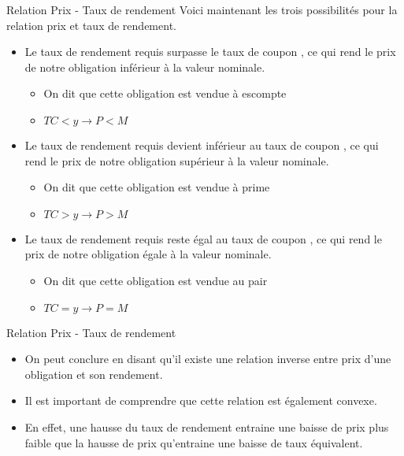\documentclass{beamer}
\begin{document}
\begin{frame}{Relation Prix - Taux de rendement}
Voici maintenant les trois possibilités pour la relation prix et taux de rendement. 
\begin{itemize}
\item Le taux de rendement requis surpasse le taux de coupon , ce qui rend le prix de notre obligation inférieur à la valeur nominale. 
\begin{itemize}
\item On dit que cette obligation est vendue à escompte 
\item $TC < y \rightarrow P < M$
\end{itemize}
\item Le taux de rendement requis devient inférieur au taux de coupon , ce qui rend le prix de notre obligation supérieur à la valeur nominale. 
\begin{itemize}
\item On dit que cette obligation est vendue à prime
\item $TC > y \rightarrow P > M$
\end{itemize}
\item Le taux de rendement requis reste égal au taux de coupon , ce qui rend le prix de notre obligation égale à la valeur nominale. 
\begin{itemize}
\item On dit que cette obligation est vendue au pair
\item $TC = y \rightarrow P = M$
\end{itemize}
\end{itemize}
\end{frame}

\begin{frame}{Relation Prix - Taux de rendement}
\begin{itemize}
\item On peut conclure en disant qu'il existe une relation inverse entre prix d'une obligation et son rendement. 
\item Il est important de comprendre que cette relation est également convexe.
\item En effet, une hausse du taux de rendement entraine une baisse de prix plus faible que la hausse de prix qu'entraine une baisse de taux équivalent.
\end{itemize}
\end{frame}
\end{document}
